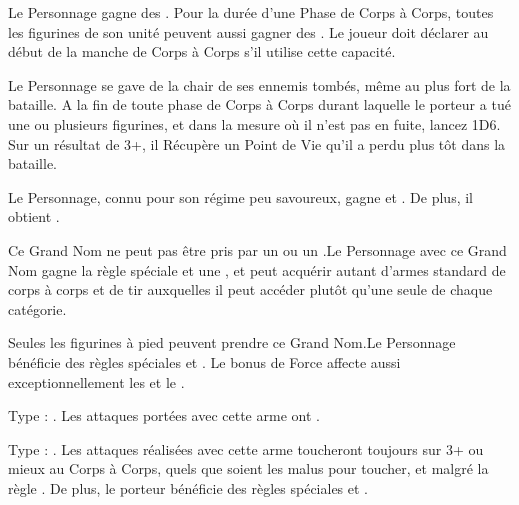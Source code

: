 \begin{multicols}{2}
Le Personnage gagne des \poisonedattacks{}. Pour la durée d'une Phase de Corps à Corps, toutes les figurines de son unité peuvent aussi gagner des \poisonedattacks{}. Le joueur doit déclarer au début de la manche de Corps à Corps s'il utilise cette capacité.

Le Personnage se gave de la chair de ses ennemis tombés, même au plus fort de la bataille. A la fin de toute phase de Corps à Corps durant laquelle le porteur a tué une ou plusieurs figurines, et dans la mesure où il n'est pas en fuite, lancez 1D6. Sur un résultat de 3+, il Récupère un Point de Vie qu'il a perdu plus tôt dans la bataille.

Le Personnage, connu pour son régime peu savoureux, gagne  et \stupidity{}. De plus, il obtient .

Ce Grand Nom ne peut pas être pris par un \wizard{} ou un \mammothhunter{}.\newline Le Personnage avec ce Grand Nom gagne la règle spéciale \weaponmaster{} et une \platearmour{}, et peut acquérir autant d'armes standard de corps à corps et de tir auxquelles il peut accéder plutôt qu'une seule de chaque catégorie.

Seules les figurines à pied peuvent prendre ce Grand Nom.\newline Le Personnage bénéficie des règles spéciales \devastatingcharge{} et \thunderouscharge{}. Le bonus de Force affecte aussi exceptionnellement les \impacthits{} et le \stomp{}.

\endpricelistNSP
\end{multicols}

\closearmynewsection

\startarmymagicalitems

\armymagicalweapons

\startpricelist

Type : \gw{}. Les attaques portées avec cette arme ont .

Type : \ironfist{}. Les attaques réalisées avec cette arme toucheront toujours sur 3+ ou mieux au Corps à Corps, quels que soient les malus pour toucher, et malgré la règle \parry{}. De plus, le porteur bénéficie des règles spéciales  et .

